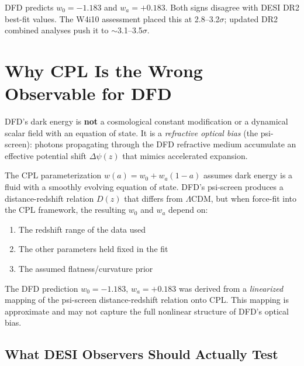 \documentclass[11pt,a4paper]{article}
\newcommand{\LCDM}{$\Lambda$CDM}
\begin{document}
DFD predicts $w_0 = -1.183$ and $w_a = +0.183$. Both signs disagree
with DESI DR2 best-fit values. The W4i10 assessment placed this at
2.8--3.2$\sigma$; updated DR2 combined analyses push it to
$\sim$3.1--3.5$\sigma$.

\section{Why CPL Is the Wrong Observable for DFD}
\label{sec:cpl-wrong}

\begin{tcolorbox}[colback=blue!3!white, colframe=blue!60!black,
  title=\textbf{Finding \thesection: The CPL parameterization is
  inappropriate for DFD}\label{find:desi}]

DFD's dark energy is \textbf{not} a cosmological constant modification
or a dynamical scalar field with an equation of state. It is a
\emph{refractive optical bias} (the psi-screen): photons propagating
through the DFD refractive medium accumulate an effective potential
shift $\Delta\psi(z)$ that mimics accelerated expansion.

The CPL parameterization $w(a) = w_0 + w_a(1-a)$ assumes dark energy
is a fluid with a smoothly evolving equation of state. DFD's psi-screen
produces a distance-redshift relation $D(z)$ that differs from \LCDM{},
but when force-fit into the CPL framework, the resulting $w_0$ and $w_a$
depend on:
\begin{enumerate}[nosep]
\item The redshift range of the data used
\item The other parameters held fixed in the fit
\item The assumed flatness/curvature prior
\end{enumerate}

The DFD prediction $w_0 = -1.183$, $w_a = +0.183$ was derived from a
\emph{linearized} mapping of the psi-screen distance-redshift relation
onto CPL. This mapping is approximate and may not capture the full
nonlinear structure of DFD's optical bias.
\end{tcolorbox}

\subsection{What DESI Observers Should Actually Test}
\end{document}
